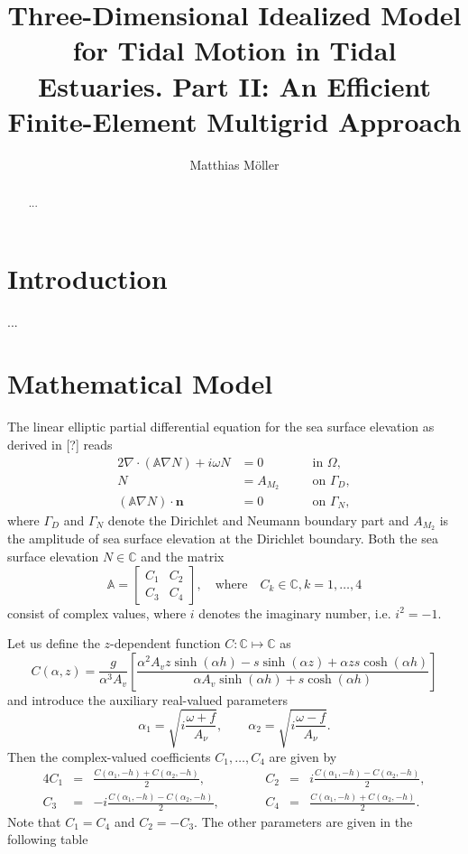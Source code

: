 \documentclass[11pt,a4paper]{article}
\title{Three-Dimensional Idealized Model for Tidal Motion in Tidal Estuaries. Part II: An Efficient Finite-Element Multigrid Approach}
\author{Matthias M\"oller}
\begin{document}
\maketitle

\begin{abstract}
...
\end{abstract}

\section{Introduction}
...

\section{Mathematical Model}

The linear elliptic partial differential equation for the sea surface elevation as derived in [?] reads
\begin{alignat}{2}
\nabla\cdot(\mathbb{A}\nabla N)+i\omega N&=0  \quad && \text{in } \Omega,
\label{eq:sse_scalar1}\\
N&=A_{M_2} \quad && \text{on } \Gamma_D,
\label{eq:sse_scalar2}\\
(\mathbb{A}\nabla N)\cdot\mathbf{n}&=0 \quad && \text{on } \Gamma_N,
\label{eq:sse_scalar3}
\end{alignat}
where $\Gamma_D$ and $\Gamma_N$ denote the Dirichlet and Neumann boundary part and $A_{M_2}$ is the amplitude of sea surface elevation at the Dirichlet boundary. Both the sea surface elevation $N\in\mathbb{C}$ and the matrix
$$
\mathbb{A}=
\begin{bmatrix}
C_1 & C_2\\
C_3 & C_4
\end{bmatrix},\quad\text{where}\quad C_k\in\mathbb{C}, k=1,\dots,4
$$
consist of complex values, where $i$ denotes the imaginary number, i.e. $i^2=-1$.

Let us define the $z$-dependent function $C:\mathbb{C}\mapsto\mathbb{C}$ as
\begin{equation}
C(\alpha,z)=\frac{g}{\alpha^3A_v}\left[\frac{\alpha^2A_vz\sinh(\alpha h)-s\sinh(\alpha z)+\alpha z s \cosh(\alpha h)}{\alpha A_v\sinh(\alpha h)+s\cosh(\alpha h)}\right]
\end{equation}
and introduce the auxiliary real-valued parameters
$$
\alpha_1=\sqrt{i\frac{\omega+f}{A_\nu}},\qquad
\alpha_2=\sqrt{i\frac{\omega-f}{A_\nu}}.
$$
Then the complex-valued coefficients $C_1,\dots,C_4$ are given by
\begin{alignat}{4}
C_1&=&\frac{C(\alpha_1,-h)+C(\alpha_2,-h)}{2},&& \qquad
C_2&=&i\frac{C(\alpha_1,-h)-C(\alpha_2,-h)}{2},\\
C_3&=&-i\frac{C(\alpha_1,-h)-C(\alpha_2,-h)}{2},&&\qquad
C_4&=&\frac{C(\alpha_1,-h)+C(\alpha_2,-h)}{2}.
\end{alignat}
Note that $C_1=C_4$ and $C_2=-C_3$. The other parameters are given in the following table
\end{document}
